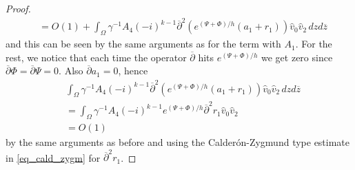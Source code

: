 \documentclass[a4paper, 10pt, twoside, notitlepage]{amsart}
\theoremstyle{plain}
\newcommand{\Om}{\Omega}
\numberwithin{equation}{section}
\newcommand {\p} {\partial}
\newcommand{\dbar}{\ol{\p}}
\newcommand{\ol}[1]{\overline{#1}}
\newcommand{\oz}{\overline{z}}
\begin{document}
\begin{proof}
\begin{align*}
		&= O(1) + \int_{\Om}\gamma^{-1}A_4(-i)^{k-1}\dbar^2\left(e^{(\Psi+\Phi)/h}(a_1+r_1)\right)\hat{v}_0\hat{v}_2\,dzd\oz
	\end{align*}
	and this can be seen by the same arguments as for the term with $A_1$. For the rest, we notice that each time the operator $\dbar$ hits $e^{(\Psi+\Phi)/h}$ we get zero since $\dbar \Phi= \dbar\Psi=0$. Also $\dbar a_1=0$, hence
	\begin{align*}
		&\int_{\Om}\gamma^{-1}A_4(-i)^{k-1}\dbar^2\left(e^{(\Psi+\Phi)/h}(a_1+r_1)\right)\hat{v}_0\hat{v}_2\,dzd\oz\\
		&= \int_{\Om} \gamma^{-1}A_4(-i)^{k-1}e^{(\Psi+\Phi)/h}\dbar^2r_1\hat{v}_0\hat{v}_2\\
		&= O(1)
	\end{align*}
	by the same arguments as before and using the Calderón-Zygmund type estimate in \eqref{eq_cald_zygm} for $\dbar^2 r_1$.
	

\end{proof}
\end{document}
